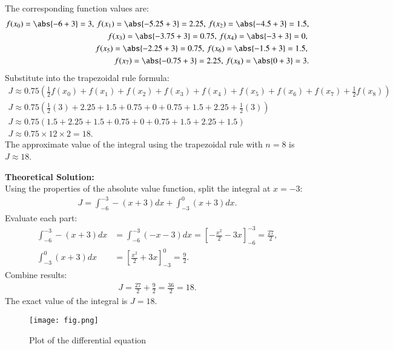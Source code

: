 \documentclass[journal]{IEEEtran}
\begin{document}
The corresponding function values are:
\begin{align}
    f(x_0) = \abs{-6 + 3} = 3, \, f(x_1) = \abs{-5.25 + 3} = 2.25, \, f(x_2) = \abs{-4.5 + 3} = 1.5, \\
    f(x_3) = \abs{-3.75 + 3} = 0.75, \, f(x_4) = \abs{-3 + 3} = 0, \, \\
    f(x_5) = \abs{-2.25 + 3} = 0.75, \, f(x_6) = \abs{-1.5 + 3} = 1.5, \, \\
    f(x_7) = \abs{-0.75 + 3} = 2.25, \, f(x_8) = \abs{0 + 3} = 3.
\end{align}
Substitute into the trapezoidal rule formula:
\begin{align}
    J \approx 0.75 \left(\frac{1}{2}f(x_0) + f(x_1) + f(x_2) + f(x_3) + f(x_4) + f(x_5) + f(x_6) + f(x_7) + \frac{1}{2}f(x_8)\right) \\
    J \approx 0.75 \left(\frac{1}{2}(3) + 2.25 + 1.5 + 0.75 + 0 + 0.75 + 1.5 + 2.25 + \frac{1}{2}(3)\right) \\
    J \approx 0.75 \left(1.5 + 2.25 + 1.5 + 0.75 + 0 + 0.75 + 1.5 + 2.25 + 1.5\right) \\
    J \approx 0.75 \times 12 \times 2 = 18.
\end{align}
The approximate value of the integral using the trapezoidal rule with $n = 8$ is $J \approx 18$.

\textbf{Theoretical Solution:}\\
Using the properties of the absolute value function, split the integral at $x = -3$:
\begin{align}
    J = \int_{-6}^{-3} -(x + 3) dx + \int_{-3}^{0} (x + 3) dx.
\end{align}
Evaluate each part:
\begin{align}
    \int_{-6}^{-3} -(x + 3) dx &= \int_{-6}^{-3} (-x - 3) dx = \left[-\frac{x^2}{2} - 3x\right]_{-6}^{-3} = \frac{27}{2}, \\
    \int_{-3}^{0} (x + 3) dx &= \left[\frac{x^2}{2} + 3x\right]_{-3}^{0} = \frac{9}{2}.
\end{align}
Combine results:
\begin{align}
    J = \frac{27}{2} + \frac{9}{2} = \frac{36}{2} = 18.
\end{align}
The exact value of the integral is $J = 18$.

\begin{figure}[h]
    \centering
    \texttt{[image: fig.png]}
    \caption{Plot of the differential equation}
    \label{fig:Plot}
    \end{figure}
    
\end{document}
